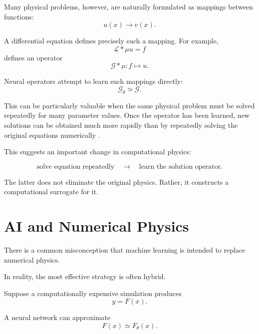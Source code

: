 \documentclass[11pt,a4paper]{article}
\begin{document}
Many physical problems, however, are naturally formulated as mappings between
functions:
\begin{equation}
u(x)\longrightarrow v(x).
\end{equation}

A differential equation defines precisely such a mapping. For example,
\begin{equation}
\mathcal{L}*\mu u=f
\end{equation}
defines an operator
\begin{equation}
\mathcal{G}*\mu:f\mapsto u.
\end{equation}

Neural operators attempt to learn such mappings directly:
\begin{equation}
\mathcal{G}_\theta\simeq\mathcal{G}.
\end{equation}

This can be particularly valuable when the same physical problem must be
solved repeatedly for many parameter values. Once the operator has been
learned, new solutions can be obtained much more rapidly than by repeatedly
solving the original equations numerically
\cite{Azizzadenesheli2024}.

This suggests an important change in computational physics:

\begin{equation}
\text{solve equation repeatedly}
\quad\longrightarrow\quad
\text{learn the solution operator}.
\end{equation}

The latter does not eliminate the original physics. Rather, it constructs a
computational surrogate for it.

\section{AI and Numerical Physics}

There is a common misconception that machine learning is intended to replace
numerical physics.

In reality, the most effective strategy is often hybrid.

Suppose a computationally expensive simulation produces
\begin{equation}
y=F(x).
\end{equation}

A neural network can approximate
\begin{equation}
F(x)\simeq F_\theta(x).
\end{equation}
\end{document}
